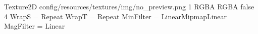 Texture2D
config/resources/textures/img/no_preview.png
1
RGBA
RGBA
false
4
WrapS = Repeat
WrapT = Repeat
MinFilter = LinearMipmapLinear
MagFilter = Linear
